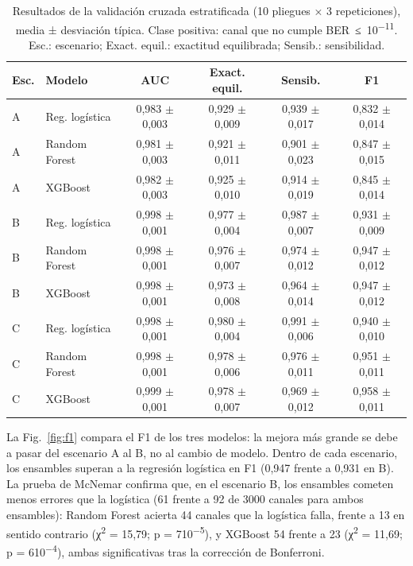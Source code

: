 \documentclass[runningheads]{llncs}
\begin{document}
\begin{table}[htbp]
\centering
\footnotesize\setlength{\tabcolsep}{3.5pt}
\caption{Resultados de la validación cruzada estratificada (10 pliegues × 3 repeticiones), media ± desviación típica. Clase positiva: canal que no cumple BER~≤~10\textsuperscript{−11}. Esc.: escenario; Exact. equil.: exactitud equilibrada; Sensib.: sensibilidad.}
\label{tab:resultados}
\begin{tabular}{llcccc}
\toprule
Esc. & Modelo & AUC & Exact. equil. & Sensib. & F1 \\
\midrule
A & Reg. logística & 0,983 $\pm$ 0,003 & 0,929 $\pm$ 0,009 & 0,939 $\pm$ 0,017 & 0,832 $\pm$ 0,014 \\
A & Random Forest & 0,981 $\pm$ 0,003 & 0,921 $\pm$ 0,011 & 0,901 $\pm$ 0,023 & 0,847 $\pm$ 0,015 \\
A & XGBoost & 0,982 $\pm$ 0,003 & 0,925 $\pm$ 0,010 & 0,914 $\pm$ 0,019 & 0,845 $\pm$ 0,014 \\
B & Reg. logística & 0,998 $\pm$ 0,001 & 0,977 $\pm$ 0,004 & 0,987 $\pm$ 0,007 & 0,931 $\pm$ 0,009 \\
B & Random Forest & 0,998 $\pm$ 0,001 & 0,976 $\pm$ 0,007 & 0,974 $\pm$ 0,012 & 0,947 $\pm$ 0,012 \\
B & XGBoost & 0,998 $\pm$ 0,001 & 0,973 $\pm$ 0,008 & 0,964 $\pm$ 0,014 & 0,947 $\pm$ 0,012 \\
C & Reg. logística & 0,998 $\pm$ 0,001 & 0,980 $\pm$ 0,004 & 0,991 $\pm$ 0,006 & 0,940 $\pm$ 0,010 \\
C & Random Forest & 0,998 $\pm$ 0,001 & 0,978 $\pm$ 0,006 & 0,976 $\pm$ 0,011 & 0,951 $\pm$ 0,011 \\
C & XGBoost & 0,999 $\pm$ 0,001 & 0,978 $\pm$ 0,007 & 0,969 $\pm$ 0,012 & 0,958 $\pm$ 0,011 \\
\bottomrule
\end{tabular}
\end{table}

La Fig.~\ref{fig:f1} compara el F1 de los tres modelos: la mejora más grande se debe a pasar del escenario A al B, no al cambio de modelo. Dentro de cada escenario, los ensambles superan a la regresión logística en F1 (0,947 frente a 0,931 en B). La prueba de McNemar confirma que, en el escenario B, los ensambles cometen menos errores que la logística (61 frente a 92 de 3000 canales para ambos ensambles): Random Forest acierta 44 canales que la logística falla, frente a 13 en sentido contrario (χ\textsuperscript{2} = 15,79; p = 7\textperiodcentered{}10\textsuperscript{−5}), y XGBoost 54 frente a 23 (χ\textsuperscript{2} = 11,69; p = 6\textperiodcentered{}10\textsuperscript{−4}), ambas significativas tras la corrección de Bonferroni.
\end{document}
